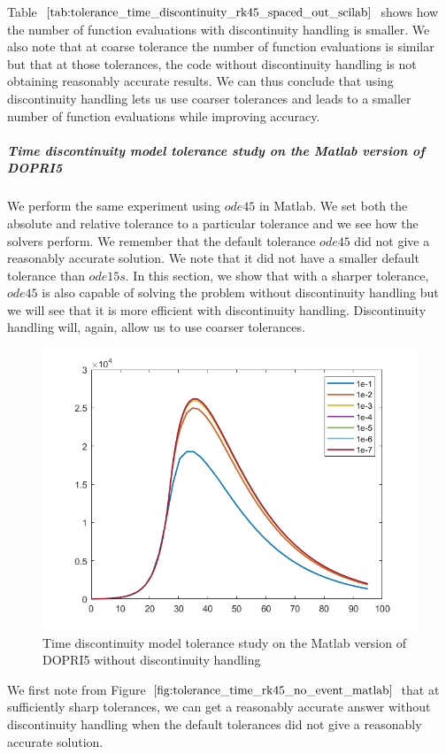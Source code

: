 Table $\ref{tab:tolerance_time_discontinuity_rk45_spaced_out_scilab}$ shows how the number of function evaluations with discontinuity handling is smaller. We also note that at coarse tolerance the number of function evaluations is similar but that at those tolerances, the code without discontinuity handling is not obtaining reasonably accurate results. We can thus conclude that using discontinuity handling lets us use coarser tolerances and leads to a smaller number of function evaluations while improving accuracy.


\subparagraph{Time discontinuity model tolerance study on the Matlab version of DOPRI5}
We perform the same experiment using $ode45$ in Matlab. We set both the absolute and relative tolerance to a particular tolerance and we see how the solvers perform. We remember that the default tolerance $ode45$ did not give a reasonably accurate solution. We note that it did not have a smaller default tolerance than $ode15s$. In this section, we show that with a sharper tolerance, $ode45$ is also capable of solving the problem without discontinuity handling but we will see that it is more efficient with discontinuity handling. Discontinuity handling will, again, allow us to use coarser tolerances.

\begin{figure}[H]
\centering
\includegraphics[width=0.7\linewidth]{./figures/tolerance_time_rk45_no_event_matlab}
\caption{Time discontinuity model tolerance study on the Matlab version of DOPRI5 without discontinuity handling}
\label{fig:tolerance_time_rk45_no_event_matlab}
\end{figure}

We first note from Figure $\ref{fig:tolerance_time_rk45_no_event_matlab}$ that at sufficiently sharp tolerances, we can get a reasonably accurate answer without discontinuity handling when the default tolerances did not give a reasonably accurate solution.

